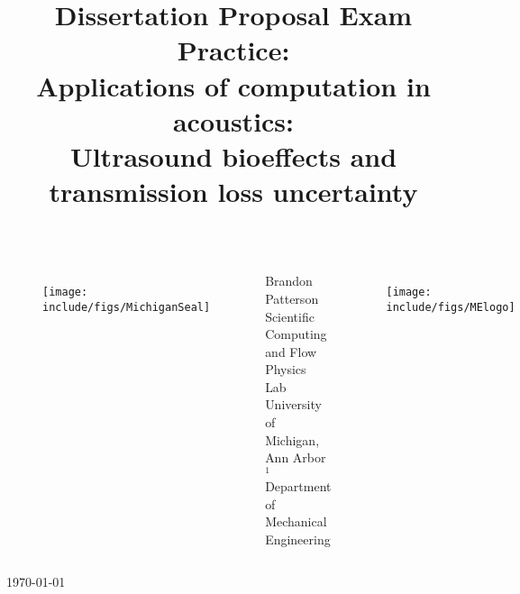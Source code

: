 \title[]{Dissertation Proposal Exam Practice:\\Applications of computation in acoustics:\\Ultrasound bioeffects and transmission loss uncertainty}
\author[] {}

\institute[]{}
\date[date]{}


\begin{frame} %
\titlepage \vspace{-2.50cm}
\centering
\begin{columns}

\begin{figure}\vspace*{1.3cm} \centering \texttt{[image: include/figs/MichiganSeal]} \end{figure}
 \begin{center}
%
\normalsize{Brandon Patterson} \vspace{12pt} \\ 
%
\footnotesize{Scientific Computing and Flow Physics Lab} \vspace{4pt}\\
\footnotesize{University of Michigan, Ann Arbor} \vspace{4pt} \\
\scriptsize{$^1$Department of Mechanical Engineering} \vspace{4pt} \\
\end{center}
\vspace*{.15cm}
\begin{figure} \vspace*{1.3cm} \centering \texttt{[image: include/figs/MElogo]} \end{figure}
\end{columns}
\begin{center}
%
%
\footnotesize {\today} \vspace{-.1cm}
%
%
\end{center}




\end{frame}
